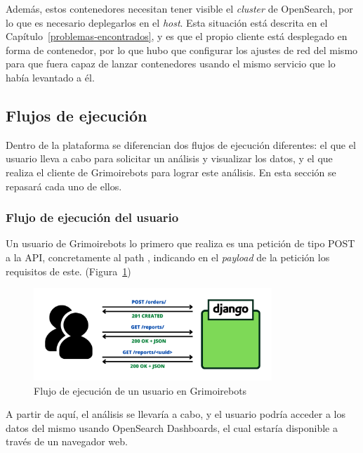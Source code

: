 Además, estos contenedores necesitan tener visible el \emph{cluster} de OpenSearch, por lo que es necesario deplegarlos en el \emph{host}. Esta situación está descrita en el Capítulo~{\ref{problemas-encontrados}}, y es que el propio cliente está desplegado en forma de contenedor, por lo que hubo que configurar los ajustes de red del mismo para que fuera capaz de lanzar contenedores usando el mismo servicio que lo había levantado a él.

\subsection{Flujos de ejecución}

Dentro de la plataforma se diferencian dos flujos de ejecución diferentes: el que el usuario lleva a cabo para solicitar un análisis y visualizar los datos, y el que realiza el cliente de Grimoirebots para lograr este análisis. En esta sección se repasará cada uno de ellos.

\subsubsection{Flujo de ejecución del usuario}

Un usuario de Grimoirebots lo primero que realiza es una petición de tipo POST a la API, concretamente al path , indicando en el \emph{payload} de la petición los requisitos de este. (Figura~{\ref{fig:grimoirebots_user_workflow}})

\begin{figure}[ht]
    \centering
    \includegraphics[width=0.8\textwidth]{Figures/grimoirebots_frontend}
    \decoRule
    \caption[Grimoirebots (flujo del usuario)]{Flujo de ejecución de un usuario en Grimoirebots}
    \label{fig:grimoirebots_user_workflow}
\end{figure}

A partir de aquí, el análisis se llevaría a cabo, y el usuario podría acceder a los datos del mismo usando OpenSearch Dashboards, el cual estaría disponible a través de un navegador web.

